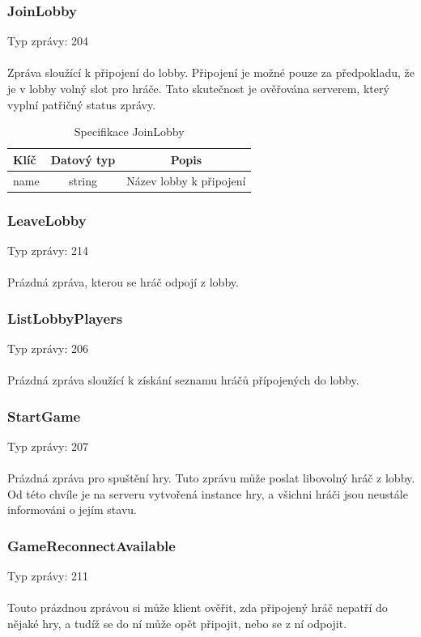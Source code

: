 \documentclass[12pt, a4paper]{article}
\begin{document}
    \subsubsection*{JoinLobby}
    Typ zprávy: 204\\\\
    Zpráva sloužící k připojení do lobby.
    Připojení je možné pouze za předpokladu, že je v lobby volný slot pro hráče.
    Tato skutečnost je ověřována serverem, který vyplní patřičný status zprávy.

    \begin{table}[H]
        \centering
        \begin{tabular}{|l|c|c|}
            \hline
            Klíč & Datový typ & Popis\\
            \hline
            \hline
            name & string & Název lobby k připojení\\
            \hline
        \end{tabular}
        \caption{Specifikace JoinLobby}
    \end{table} 

    \subsubsection*{LeaveLobby}
    Typ zprávy: 214\\\\
    Prázdná zpráva, kterou se hráč odpojí z lobby.

    \subsubsection*{ListLobbyPlayers}
    Typ zprávy: 206\\\\
    Prázdná zpráva sloužící k získání seznamu hráčů přípojených do lobby.

    \subsubsection*{StartGame}
    Typ zprávy: 207\\\\
    Prázdná zpráva pro spuštění hry.
    Tuto zprávu může poslat libovolný hráč z lobby.
    Od této chvíle je na serveru vytvořená instance hry, a všichni hráči jsou neustále informováni o jejím stavu.

    \subsubsection*{GameReconnectAvailable}
    Typ zprávy: 211\\\\
    Touto prázdnou zprávou si může klient ověřit, zda připojený hráč nepatří do nějaké hry, a tudíž se do ní může opět připojit, nebo se z ní odpojit.
\end{document}
